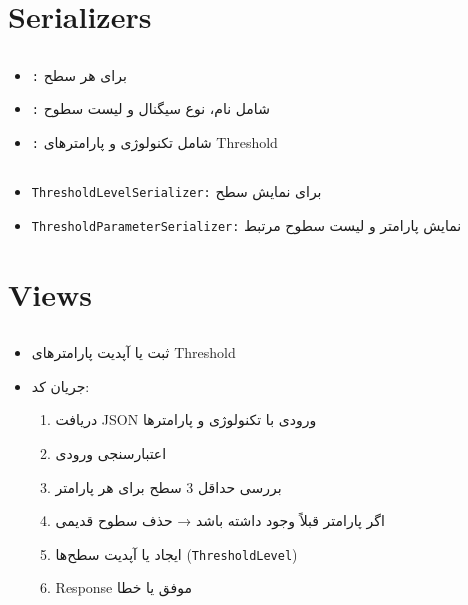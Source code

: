 \documentclass{report}
\begin{document}
\section{Serializers}

\subsection{}
\begin{itemize}
    \item \texttt{:} برای هر سطح
    \item \texttt{:} شامل نام، نوع سیگنال و لیست سطوح
    \item \texttt{:} شامل تکنولوژی و پارامترهای Threshold
\end{itemize}

\subsection{}
\begin{itemize}
    \item \texttt{ThresholdLevelSerializer:} برای نمایش سطح
    \item \texttt{ThresholdParameterSerializer:} نمایش پارامتر و لیست سطوح مرتبط
\end{itemize}

\section{Views}

\subsection{}
\begin{itemize}
    \item ثبت یا آپدیت پارامترهای Threshold
    \item جریان کد:
    \begin{enumerate}
        \item دریافت JSON ورودی با تکنولوژی و پارامترها
        \item اعتبارسنجی ورودی
        \item بررسی حداقل 3 سطح برای هر پارامتر
        \item اگر پارامتر قبلاً وجود داشته باشد → حذف سطوح قدیمی
        \item ایجاد یا آپدیت سطح‌ها (\texttt{ThresholdLevel})
        \item Response موفق  یا خطا 
    \end{enumerate}
\end{itemize}
\end{document}
